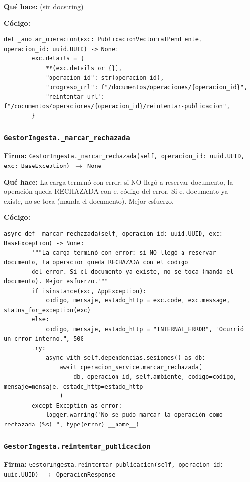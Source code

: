 \documentclass[11pt,a4paper]{article}
\begin{document}
\textbf{Qué hace:} (sin docstring)

\textbf{Código:}
\begin{lstlisting}
def _anotar_operacion(exc: PublicacionVectorialPendiente, operacion_id: uuid.UUID) -> None:
        exc.details = {
            **(exc.details or {}),
            "operacion_id": str(operacion_id),
            "progreso_url": f"/documentos/operaciones/{operacion_id}",
            "reintentar_url": f"/documentos/operaciones/{operacion_id}/reintentar-publicacion",
        }
\end{lstlisting}

\subsubsection*{\texttt{GestorIngesta.\_marcar\_rechazada}}
\textbf{Firma:} \texttt{GestorIngesta.\_marcar\_rechazada(self, operacion\_id: uuid.UUID, exc: BaseException) $\rightarrow$ None}

\textbf{Qué hace:} La carga terminó con error: si NO llegó a reservar documento, la operación queda RECHAZADA con el código
del error. Si el documento ya existe, no se toca (manda el documento). Mejor esfuerzo.

\textbf{Código:}
\begin{lstlisting}
async def _marcar_rechazada(self, operacion_id: uuid.UUID, exc: BaseException) -> None:
        """La carga terminó con error: si NO llegó a reservar documento, la operación queda RECHAZADA con el código
        del error. Si el documento ya existe, no se toca (manda el documento). Mejor esfuerzo."""
        if isinstance(exc, AppException):
            codigo, mensaje, estado_http = exc.code, exc.message, status_for_exception(exc)
        else:
            codigo, mensaje, estado_http = "INTERNAL_ERROR", "Ocurrió un error interno.", 500
        try:
            async with self.dependencias.sesiones() as db:
                await operacion_service.marcar_rechazada(
                    db, operacion_id, self.ambiente, codigo=codigo, mensaje=mensaje, estado_http=estado_http
                )
        except Exception as error:
            logger.warning("No se pudo marcar la operación como rechazada (%s).", type(error).__name__)
\end{lstlisting}

\subsubsection*{\texttt{GestorIngesta.reintentar\_publicacion}}
\textbf{Firma:} \texttt{GestorIngesta.reintentar\_publicacion(self, operacion\_id: uuid.UUID) $\rightarrow$ OperacionResponse}
\end{document}
